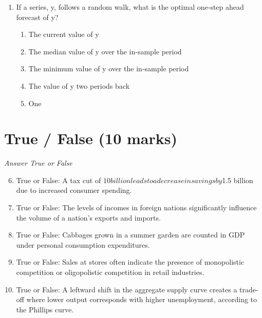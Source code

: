 \documentclass[12pt]{article}
\begin{document}
\begin{enumerate}[label=\arabic*.]
\begin{enumerate}[label=(\alph*)]
    \item a decrease in the money supply.
    \item an increase in consumer confidence.
    \item a sudden surge in technological innovation.
    \item a prolonged period of very bad weather.
    \item a decrease in consumer confidence.
\end{enumerate}
\item If a series, y, follows a random walk, what is the optimal one-step ahead forecast of y?
\begin{enumerate}[label=(\alph*)]
    \item The current value of y
    \item The median value of y over the in-sample period
    \item The minimum value of y over the in-sample period
    \item The value of y two periods back
    \item One
\end{enumerate}
\end{enumerate}

\section*{True / False (10 marks)}
\textit{Answer True or False}
\begin{enumerate}[label=\arabic*.]
\setcounter{enumi}{5}
\item True or False: A tax cut of $10 billion leads to a decrease in savings by $1.5 billion due to increased consumer spending.
\item True or False: The levels of incomes in foreign nations significantly influence the volume of a nation's exports and imports.
\item True or False: Cabbages grown in a summer garden are counted in GDP under personal consumption expenditures.
\item True or False: Sales at stores often indicate the presence of monopolistic competition or oligopolistic competition in retail industries.
\item True or False: A leftward shift in the aggregate supply curve creates a trade-off where lower output corresponds with higher unemployment, according to the Phillips curve.
\end{enumerate}
\end{document}
